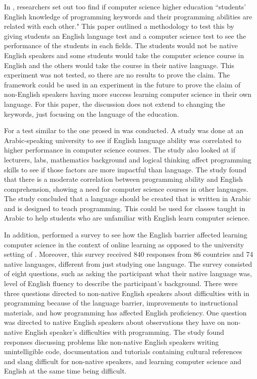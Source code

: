 \documentclass[10pt,twocolumn]{article}
\begin{document}
 In \textcite{Veerasamy2014Teaching}, researchers set out too find if computer science higher education ``students’ English knowledge of programming keywords and their programming abilities are related with each other." This paper outlined a methodology to test this by giving students an English language test and a computer science test to see the performance of the students in each fields. The students would not be native English speakers and some students would take the computer science course in English and the others would take the course in their native language. This experiment was not tested, so there are no results to prove the claim. The framework could be used in an experiment in the future to prove the claim of non-English speakers having more success learning computer science in their own language. For this paper, the discussion does not extend to changing the keywords, just focusing on the language of the education.

For \textcite{Idris2018Correlation} a test similar to the one prosed in \textcite{Veerasamy2014Teaching} was conducted. A study was done at an Arabic-speaking university to see if English language ability was correlated to higher performance in computer science courses. The study also looked at if lecturers, labs, mathematics background and logical thinking affect programming skills to see if those factors are more impactful than language. The study found that there is a moderate correlation between programming ability and English comprehension, showing a need for computer science courses in other languages. The study concluded that a language should be created that is written in Arabic and is designed to teach programming. This could be used for classes taught in Arabic to help students who are unfamiliar with English learn computer science.

In addition, \textcite{Guo2018Non} performed a survey to see how the English barrier affected learning computer science in the context of online learning as opposed to the university setting of \textcite{Idris2018Correlation}. Moreover, this survey received 840 responses from 86 countries and 74 native languages, different from just studying one language. The survey consisted of eight questions, such as asking the participant what their native language was, level of English fluency to describe the participant's background. There were three questions directed to non-native English speakers about difficulties with in programming because of the language barrier, improvements to instructional materials, and how programming has affected English proficiency. One question was directed to native English speakers about observations they have on non-native English speaker's difficulties with programming. The study found responses discussing problems like non-native English speakers writing unintelligible code, documentation and tutorials containing cultural references and slang difficult for non-native speakers, and learning computer science and English at the same time being difficult.
\end{document}
